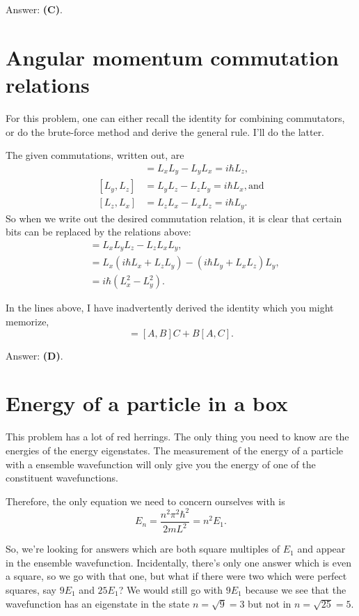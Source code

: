 \documentclass[11pt]{paper}
\newcommand{\answer}[1]{Answer: \textbf{(#1)}.}
\begin{document}
\answer{C}

\section{Angular momentum commutation relations}
For this problem, one can either recall the identity for combining commutators, or do the brute-force method and derive the general rule.  I'll do the latter.

The given commutations, written out, are
\begin{align}
[L_x,L_y] &= L_xL_y - L_yL_x = i\hbar L_z,\\
[L_y,L_z] &= L_yL_z - L_zL_y = i\hbar L_x, \text{and}\\
[L_z,L_x] &= L_zL_x - L_xL_z=  i\hbar L_y.
\end{align}
So when we write out the desired commutation relation, it is clear that certain bits can be replaced by the relations above:
\begin{align}
[L_x L_y, L_z] &= L_x L_y L_z - L_zL_xL_y,\\
&= L_x \left(i\hbar L_x + L_zL_y\right) - (i\hbar L_y + L_xL_z)L_y,\\
&= i\hbar \left(L_x^2 - L_y^2\right).
\end{align}

In the lines above, I have inadvertently derived the identity which you might memorize,
\begin{equation}
[AB,C] = [A,B]C + B[A,C].
\end{equation}

\answer{D}

\section{Energy of a particle in a box}
This problem has a lot of red herrings.  The only thing you need to know are the energies of the energy eigenstates.  The measurement of the energy of a particle with a ensemble wavefunction will only give you the energy of one of the constituent wavefunctions.

Therefore, the only equation we need to concern ourselves with is
\begin{equation}
E_n = \frac{n^2 \pi^2 \hbar^2}{2mL^2} = n^2 E_1.
\end{equation}

So, we're looking for answers which are both square multiples of $E_1$ and appear in the ensemble wavefunction.  Incidentally, there's only one answer which is even a square, so we go with that one, but what if there were two which were perfect squares, say $9E_1$ and $25E_1$?  We would still go with $9E_1$ because we see that the wavefunction has an eigenstate in the state $n=\sqrt{9}=3$ but not in $n=\sqrt{25}=5$.\\
\end{document}
